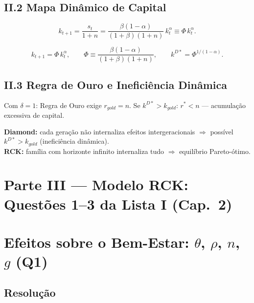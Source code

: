 \documentclass[12pt, a4paper]{article}
\begin{document}
\subsection*{II.2 Mapa Dinâmico de Capital}

\[
k_{t+1} = \frac{s_t}{1+n} = \frac{\beta(1-\alpha)}{(1+\beta)(1+n)}\,k_t^\alpha \equiv \Phi\, k_t^\alpha.
\]

\begin{resultbox}[title={Mapa Dinâmico de Diamond}]
\[
k_{t+1} = \Phi\, k_t^\alpha, \qquad \Phi \equiv \frac{\beta(1-\alpha)}{(1+\beta)(1+n)},\qquad k^{D*} = \Phi^{1/(1-\alpha)}.
\]
\end{resultbox}

\subsection*{II.3 Regra de Ouro e Ineficiência Dinâmica}

Com $\delta=1$: Regra de Ouro exige $r_{gold} = n$. Se $k^{D*} > k_{gold}$: $r^* < n$ --- acumulação excessiva de capital.

\begin{provabox}[title={Ineficiência Dinâmica no Diamond vs.\ RCK}]
\textbf{Diamond:} cada geração não internaliza efeitos intergeracionais $\Rightarrow$ possível $k^{D*} > k_{gold}$ (ineficiência dinâmica).\\
\textbf{RCK:} família com horizonte infinito internaliza tudo $\Rightarrow$ equilíbrio Pareto-ótimo.
\end{provabox}

\section*{\large\color{cyanrbc} Parte III --- Modelo RCK: Questões 1--3 da Lista I (Cap.\ 2)}

\setcounter{section}{0}

\section{Efeitos sobre o Bem-Estar: $\theta$, $\rho$, $n$, $g$ (Q1)}

\subsection*{Resolução}
\end{document}
